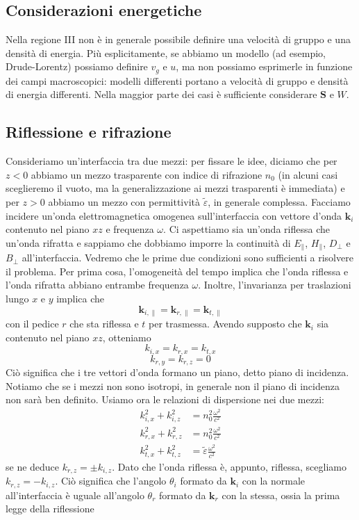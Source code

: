 \documentclass[a4paper,11pt]{book}
\renewcommand{\vec}[1]{\mathbf{#1}}
\theoremstyle{theorem}
\theoremstyle{definition}
\begin{document}
\subsection{Considerazioni energetiche}
Nella regione III non è in generale possibile definire una velocità di gruppo e una densità di energia. Più esplicitamente, se abbiamo un modello (ad esempio, Drude-Lorentz) possiamo definire $v_g$ e $u$, ma non possiamo esprimerle in funzione dei campi macroscopici: modelli differenti portano a velocità di gruppo e densità di energia differenti. Nella maggior parte dei casi è sufficiente considerare $\vec{S}$ e $W$.
\subsection{Riflessione e rifrazione}
Consideriamo un'interfaccia tra due mezzi: per fissare le idee, diciamo che per $z<0$ abbiamo un mezzo trasparente con indice di rifrazione $n_0$ (in alcuni casi sceglieremo il vuoto, ma la generalizzazione ai mezzi trasparenti è immediata) e per $z>0$ abbiamo un mezzo con permittività $\tilde{\varepsilon}$, in generale complessa. Facciamo incidere un'onda elettromagnetica omogenea sull'interfaccia con vettore d'onda $\vec{k}_i$ contenuto nel piano $xz$ e frequenza $\omega$. Ci aspettiamo sia un'onda riflessa che un'onda rifratta e sappiamo che dobbiamo imporre la continuità di $E_\parallel$, $H_\parallel$, $D_\perp$ e $B_\perp$ all'interfaccia. Vedremo che le prime due condizioni sono sufficienti a risolvere il problema. Per prima cosa, l'omogeneità del tempo implica che l'onda riflessa e l'onda rifratta abbiano entrambe frequenza $\omega$. Inoltre, l'invarianza per traslazioni lungo $x$ e $y$ implica che 
\[\vec{k}_{i,\parallel}=\vec{k}_{r,\parallel}=\vec{k}_{t,\parallel}\]
con il pedice $r$ che sta riflessa e $t$ per trasmessa. Avendo supposto che $\vec{k}_i$ sia contenuto nel piano $xz$, otteniamo
\[k_{i,x}=k_{r,x}=k_{t,x}\]
\[k_{r,y}=k_{r,z}=0\]
Ciò significa che i tre vettori d'onda formano un piano, detto piano di incidenza. Notiamo che se i mezzi non sono isotropi, in generale non il piano di incidenza non sarà ben definito. Usiamo ora le relazioni di dispersione nei due mezzi:
\begin{align*}
	k_{i,x}^2+k_{i,z}^2&=n_0^2\frac{\omega^2}{c^2}\\k_{r,x}^2+k_{r,z}^2&=n_0^2\frac{\omega^2}{c^2}\\k_{t,x}^2+k_{t,z}^2&=\tilde{\varepsilon}\frac{\omega^2}{c^2}
\end{align*}
se ne deduce $k_{r,z}=\pm k_{i,z}$. Dato che l'onda riflessa è, appunto, riflessa, scegliamo $k_{r,z}=-k_{i,z}$. Ciò significa che l'angolo $\theta_i$ formato da $\vec{k}_i$ con la normale all'interfaccia è uguale all'angolo $\theta_r$ formato da $\vec{k}_r$ con la stessa, ossia la prima legge della riflessione
\end{document}
